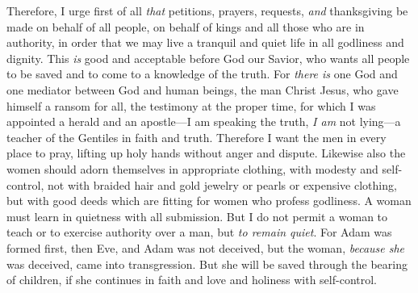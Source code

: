 \begin{biblechapter} %
 Therefore, I urge first of all \textit{that} petitions, prayers, requests, \textit{and} thanksgiving be made on behalf of all people,
\verse on behalf of kings and all those who are in authority, in order that we may live a tranquil and quiet life in all godliness and dignity.
\verse This \textit{is} good and acceptable before God our Savior,
\verse who wants all people to be saved and to come to a knowledge of the truth.
\verse For \textit{there is} one God and one mediator between God and human beings, the man Christ Jesus,
\verse who gave himself a ransom for all, the testimony at the proper time,
\verse for which I was appointed a herald and an apostle—I am speaking the truth, \textit{I am} not lying—a teacher of the Gentiles in faith and truth.
\verse Therefore I want the men in every place to pray, lifting up holy hands without anger and dispute.
 Likewise also the women should adorn themselves in appropriate clothing, with modesty and self-control, not with braided hair and gold jewelry or pearls or expensive clothing,
\verse but with good deeds which are fitting for women who profess godliness.
\verse A woman must learn in quietness with all submission.
\verse But I do not permit a woman to teach or to exercise authority over a man, but \textit{to remain quiet}.
\verse For Adam was formed first, then Eve,
\verse and Adam was not deceived, but the woman, \textit{because she} was deceived, came into transgression.
\verse But she will be saved through the bearing of children, if she continues in faith and love and holiness with self-control.
\end{biblechapter}

